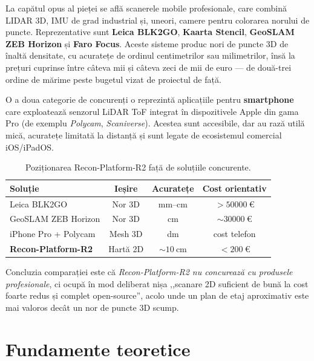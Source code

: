 \documentclass[a4paper,12pt,twoside,openany]{report}
\begin{document}
La capătul opus al pieței se află scanerele mobile profesionale, care
combină LIDAR 3D, IMU de grad industrial și, uneori, camere pentru
colorarea norului de puncte. Reprezentative sunt \textbf{Leica BLK2GO},
\textbf{Kaarta Stencil}, \textbf{GeoSLAM ZEB Horizon} și \textbf{Faro
Focus}. Aceste sisteme produc nori de puncte 3D de înaltă densitate, cu
acuratețe de ordinul centimetrilor sau milimetrilor, însă la prețuri
cuprinse între câteva mii și câteva zeci de mii de euro --- de două-trei
ordine de mărime peste bugetul vizat de proiectul de față.

O a doua categorie de concurenți o reprezintă aplicațiile pentru
\textbf{smartphone} care exploatează senzorul LiDAR ToF integrat în
dispozitivele Apple din gama Pro (de exemplu \textit{Polycam},
\textit{Scaniverse}). Acestea sunt accesibile, dar au rază utilă mică,
acuratețe limitată la distanță și sunt legate de ecosistemul comercial
iOS/iPadOS.

\begin{table}[H]
\centering
\caption{Poziționarea Recon-Platform-R2 față de soluțiile concurente.}
\label{tab:competitors}
\renewcommand{\arraystretch}{1.15}
\begin{tabular}{lccc}
\toprule
\textbf{Soluție} & \textbf{Ieșire} & \textbf{Acuratețe} & \textbf{Cost orientativ} \\
\midrule
Leica BLK2GO     & Nor 3D & mm--cm & $> \SI{50000}{\euro}$ \\
GeoSLAM ZEB Horizon & Nor 3D & cm   & $\sim\SI{30000}{\euro}$ \\
iPhone Pro + Polycam & Mesh 3D & dm  & cost telefon \\
\textbf{Recon-Platform-R2} & Hartă 2D & $\sim\SI{10}{\centi\meter}$ & $< \SI{200}{\euro}$ \\
\bottomrule
\end{tabular}
\end{table}

Concluzia comparației este că \textit{Recon-Platform-R2 nu concurează cu
produsele profesionale}, ci ocupă în mod deliberat nișa
,,scanare 2D suficient de bună la cost foarte redus și complet
open-source'', acolo unde un plan de etaj aproximativ este mai valoros
decât un nor de puncte 3D scump.

\clearpage

\chapter{Fundamente teoretice}
\label{cap:teorie}
\end{document}
